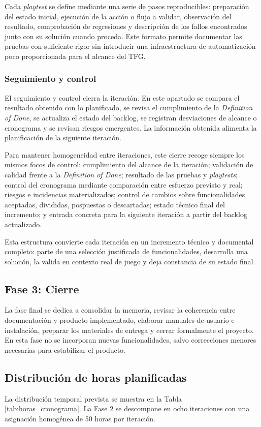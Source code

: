 Cada \textit{playtest} se define mediante una serie de pasos reproducibles: preparación del
estado inicial, ejecución de la acción o flujo a validar, observación del resultado,
comprobación de regresiones y descripción de los fallos encontrados junto con su solución
cuando proceda. Este formato permite documentar las pruebas con suficiente rigor sin
introducir una infraestructura de automatización poco proporcionada para el alcance del TFG.

\subsubsection{Seguimiento y control}
El seguimiento y control cierra la iteración. En este apartado se compara el resultado
obtenido con lo planificado, se revisa el cumplimiento de la \textit{Definition of Done}, se
actualiza el estado del backlog, se registran desviaciones de alcance o cronograma y se
revisan riesgos emergentes. La información obtenida alimenta la planificación de la
siguiente iteración.

Para mantener homogeneidad entre iteraciones, este cierre recoge siempre los mismos focos
de control: cumplimiento del alcance de la iteración; validación de calidad frente a la
\textit{Definition of Done}; resultado de las pruebas y \textit{playtests}; control del
cronograma mediante comparación entre esfuerzo previsto y real; riesgos e incidencias
materializados; control de cambios sobre funcionalidades aceptadas, divididas, pospuestas o
descartadas; estado técnico final del incremento; y entrada concreta para la siguiente
iteración a partir del backlog actualizado.

Esta estructura convierte cada iteración en un incremento técnico y documental completo:
parte de una selección justificada de funcionalidades, desarrolla una solución, la valida en
contexto real de juego y deja constancia de su estado final.

\subsection{Fase 3: Cierre}
La fase final se dedica a consolidar la memoria, revisar la coherencia entre documentación y
producto implementado, elaborar manuales de usuario e instalación, preparar los materiales
de entrega y cerrar formalmente el proyecto. En esta fase no se incorporan nuevas
funcionalidades, salvo correcciones menores necesarias para estabilizar el producto.

\subsection{Distribución de horas planificadas}
La distribución temporal prevista se muestra en la Tabla \ref{tab:horas_cronograma}. La
Fase 2 se descompone en ocho iteraciones con una asignación homogénea de 50 horas por
iteración.

